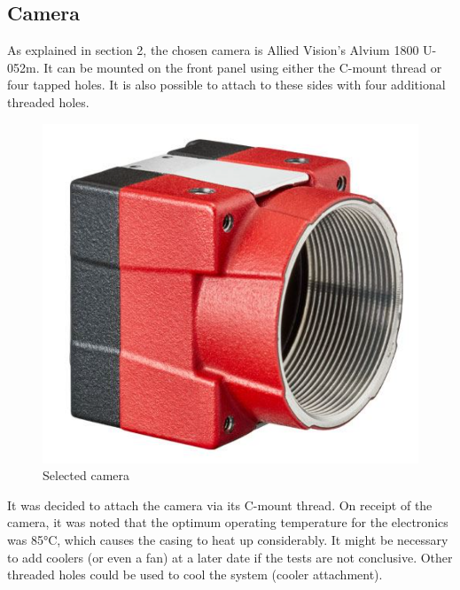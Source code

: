 \subsection{Camera}
As explained in section 2, the chosen camera is Allied Vision's Alvium 1800 U-052m. \newline
It can be mounted on the front panel using either the C-mount thread or four tapped 
holes. It is also possible to attach to these sides with four additional threaded holes.
\begin{figure}[H]
    \centering
    \includegraphics[scale=0.35]{assets/figures/Mechanical Design/Camera.png}
    \caption{Selected camera}
    \label{fig:Camera}
\end{figure}
It was decided to attach the camera via its C-mount thread. On receipt of the camera, it was noted that the 
optimum operating temperature for the electronics was 85°C, which causes the casing to heat up considerably. 
It might be necessary to add coolers (or even a fan) at a later date if the tests are not conclusive. 
Other threaded holes could be used to cool the system (cooler attachment).
